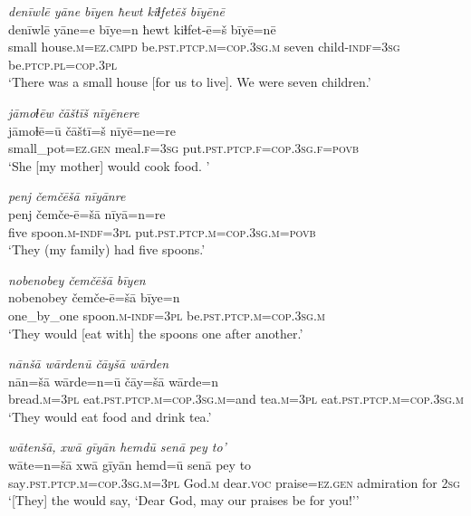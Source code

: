 \ea \label{ŽE.44}
\textit{denīwlē yāne bīyen ħewt kiɫfetēš bīyēnē} \\ 
\gll denīwlē yāne=e bīye=n ħewt kiɫfet-ē=š bīyē=nē \\ 
 small house\textsc{.m}\textsc{=ez}\textsc{.cmpd} be\textsc{.pst}\textsc{.ptcp}\textsc{.m}\textsc{=cop}\textsc{.3sg}\textsc{.m} seven child\textsc{-indf}\textsc{=3sg} be\textsc{.ptcp}\textsc{.pl}\textsc{=cop}\textsc{.3pl} \\ 
\glt `There was a small house [for us to live]. We were seven children.'
\z 
 
\ea \label{ŽE.45}
\textit{jāmoɫēw čāštīš nīyēnere} \\ 
\gll jāmoɫē=ū čāštī=š nīyē=ne=re \\ 
 small\_pot\textsc{\textsc{=ez.gen}} meal\textsc{.f}\textsc{=3sg} put\textsc{.pst}\textsc{.ptcp}\textsc{.f}\textsc{=cop}\textsc{.3sg}\textsc{.f}\textsc{=\textsc{povb}} \\ 
\glt `She [my mother] would cook food. '
\z 
 
\ea \label{ŽE.46}
\textit{penj čemčēšā nīyānre} \\ 
\gll penj čemče-ē=šā nīyā=n=re \\ 
 five spoon\textsc{.m}\textsc{-indf}\textsc{=3pl} put\textsc{.pst}\textsc{.ptcp}\textsc{.m}\textsc{=cop}\textsc{.3sg}\textsc{.m}\textsc{=\textsc{povb}} \\ 
\glt `They (my family) had five spoons.'
\z 
 
\ea \label{ŽE.47}
\textit{nobenobey čemčēšā bīyen} \\ 
\gll nobenobey čemče-ē=šā bīye=n \\ 
 one\_by\_one spoon\textsc{.m}\textsc{-indf}\textsc{=3pl} be\textsc{.pst}\textsc{.ptcp}\textsc{.m}\textsc{=cop}\textsc{.3sg}\textsc{.m} \\ 
\glt `They would [eat with] the spoons one after another.'
\z 
 
\ea \label{ŽE.48}
\textit{nānšā wārdenū čāyšā wārden} \\ 
\gll nān=šā wārde=n=ū čāy=šā wārde=n \\ 
 bread\textsc{.m}\textsc{=3pl} eat\textsc{.pst}\textsc{.ptcp}\textsc{.m}\textsc{=cop}\textsc{.3sg}\textsc{.m}=and tea\textsc{.m}\textsc{=3pl} eat\textsc{.pst}\textsc{.ptcp}\textsc{.m}\textsc{=cop}\textsc{.3sg}\textsc{.m} \\ 
\glt `They would eat food and drink tea.'
\z 
 
\ea \label{ŽE.49}
\textit{wātenšā, xwā gīyān hemdū senā pey to’} \\ 
\gll wāte=n=šā xwā gīyān hemd=ū senā pey to \\ 
 say\textsc{.pst}\textsc{.ptcp}\textsc{.m}\textsc{=cop}\textsc{.3sg}\textsc{.m}\textsc{=3pl} God\textsc{.m} dear.\textsc{voc} praise\textsc{\textsc{=ez.gen}} admiration for \textsc{2sg} \\ 
\glt `[They] the would say, ‘Dear God, may our praises be for you!’'
\z 
 
